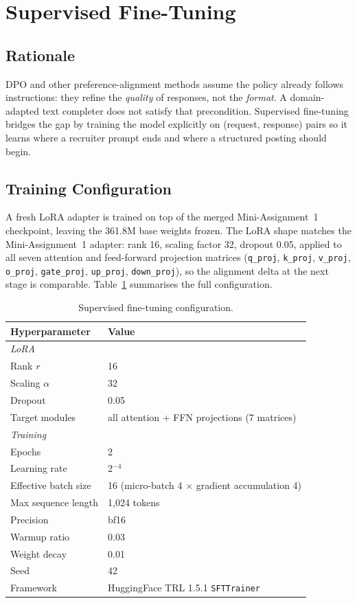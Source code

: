 \documentclass[../main.tex]{subfiles}
\begin{document}
\section{Supervised Fine-Tuning}
\label{sec:sft}

\subsection{Rationale}
\label{sec:sft_rationale}

DPO and other preference-alignment methods assume the policy already follows instructions: they refine the \emph{quality} of responses, not the \emph{format}. A domain-adapted text completer does not satisfy that precondition. Supervised fine-tuning bridges the gap by training the model explicitly on (request, response) pairs so it learns where a recruiter prompt ends and where a structured posting should begin.

\subsection{Training Configuration}
\label{sec:sft_config}

A fresh LoRA adapter is trained on top of the merged Mini-Assignment~1 checkpoint, leaving the 361.8M base weights frozen. The LoRA shape matches the Mini-Assignment~1 adapter: rank 16, scaling factor 32, dropout 0.05, applied to all seven attention and feed-forward projection matrices (\texttt{q\_proj}, \texttt{k\_proj}, \texttt{v\_proj}, \texttt{o\_proj}, \texttt{gate\_proj}, \texttt{up\_proj}, \texttt{down\_proj}), so the alignment delta at the next stage is comparable. Table~\ref{tab:sft_config} summarises the full configuration.

\begin{table}[h]
\centering
\small
\begin{tabular}{ll}
\toprule
\textbf{Hyperparameter} & \textbf{Value} \\
\midrule
\multicolumn{2}{l}{\textit{LoRA}} \\
Rank $r$ & 16 \\
Scaling $\alpha$ & 32 \\
Dropout & 0.05 \\
Target modules & all attention + FFN projections (7 matrices) \\
\midrule
\multicolumn{2}{l}{\textit{Training}} \\
Epochs & 2 \\
Learning rate & 2\texttimes10$^{-4}$ \\
Effective batch size & 16 (micro-batch 4 $\times$ gradient accumulation 4) \\
Max sequence length & 1{,}024 tokens \\
Precision & bf16 \\
Warmup ratio & 0.03 \\
Weight decay & 0.01 \\
Seed & 42 \\
Framework & HuggingFace TRL 1.5.1 \texttt{SFTTrainer} \\
\bottomrule
\end{tabular}
\caption{Supervised fine-tuning configuration.}
\label{tab:sft_config}
\end{table}
\end{document}
